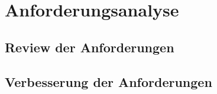 \section{Anforderungsanalyse}\label{Anforderungsanalyse}

\subsection{Review der Anforderungen}



\subsection{Verbesserung der Anforderungen}

